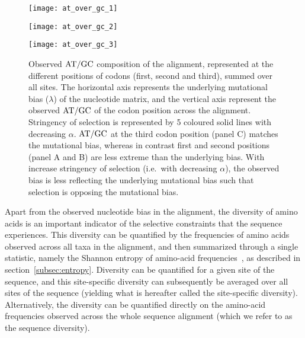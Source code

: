 \begin{figure}[htbp]
    \centering
    \begin{minipage}{0.32\linewidth}
        \texttt{[image: at\_over\_gc\_1]}
    \end{minipage}
    \hfill
    \begin{minipage}{0.32\linewidth}
        \texttt{[image: at\_over\_gc\_2]}
    \end{minipage}
    \hfill
    \begin{minipage}{0.32\linewidth}
        \texttt{[image: at\_over\_gc\_3]}
    \end{minipage}
    \hfill
    \caption[$\atgc$ composition of the alignment]{
    Observed $\atgc$ composition of the alignment, represented at the different positions of codons (first, second and third), summed over all sites.
    The horizontal axis represents the underlying mutational bias ($\lambda$) of the nucleotide matrix, and the vertical axis represent the observed $\atgc$ of the codon position across the alignment.
    Stringency of selection is represented by 5 coloured solid lines with decreasing $\alpha$.
    $\atgc$ at the third codon position (panel C) matches the mutational bias, whereas in contrast first and second positions (panel A and B) are less extreme than the underlying bias.
    With increase stringency of selection (i.e.~with decreasing $\alpha$), the observed bias is less reflecting the underlying mutational bias such that selection is opposing the mutational bias.}
    \label{fig:mut-bias-AT-GC-obs}
\end{figure}

Apart from the observed nucleotide bias in the alignment, the diversity of amino acids is an important indicator of the selective constraints that the sequence experiences.
This diversity can be quantified by the frequencies of amino acids observed across all taxa in the alignment, and then summarized through a single statistic, namely the Shannon entropy of amino-acid frequencies~\citep{Goldstein2017}, as described in section~\ref{subsec:entropy}.
Diversity can be quantified for a given site of the sequence, and this site-specific diversity can subsequently be averaged over all sites of the sequence (yielding what is hereafter called the site-specific diversity).
Alternatively, the diversity can be quantified directly on the amino-acid frequencies observed across the whole sequence alignment (which we refer to as the sequence diversity).

